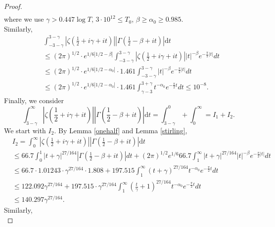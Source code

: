 \documentclass[reqno]{amsart}
\numberwithin{equation}{section}
\theoremstyle{remark}
\begin{document}
\begin{proof}
\begin{equation}
\begin{aligned}
    \end{aligned}
\end{equation}
where we use $\gamma>0.447\log T$, $3\cdot 10^{12}\le T_0$, $\beta\ge \alpha_0\ge 0.985$.\\Similarly,
\begin{equation}\label{secondint}
    \begin{aligned}
     &\int_{-3-\gamma}^{3-\gamma} \left|\zeta\left(\frac{1}{2}+i\gamma+it\right)\right|\left| \Gamma\left(\frac{1}{2}-\beta+it\right)\right|\text{d} t\\&\le (2\pi)^{1/2}\cdot e^{1/6|1/2-\beta|} \int_{-3-\gamma}^{3-\gamma}\left|\zeta\left(\frac{1}{2}+i\gamma+it\right)\right||t|^{-\beta}e^{-\frac{\pi}{2}|t|}dt \\&\le (2\pi)^{1/2}\cdot e^{1/6|1/2-\alpha_0|}\cdot1.461\int_{-3-\gamma}^{3-\gamma}|t|^{-\beta}e^{-\frac{\pi}{2}|t|}dt\\&\le (2\pi)^{1/2}\cdot e^{1/6|1/2-\alpha_0|}\cdot1.461\int_{\gamma-3}^{3+\gamma}t^{-\alpha_0}e^{-\frac{\pi}{2}t}dt\le 10^{-8}.
    \end{aligned}
\end{equation}
Finally, we consider
\[
\int_{3 - \gamma}^{\infty} \left|\zeta\left(\frac{1}{2}+i\gamma+it\right)\right|\left| \Gamma\left(\frac{1}{2}-\beta+it\right)\right|\text{d} t = \int_{3 - \gamma}^0 + \int_0^\infty = I_1 + I_2.
\]
We start with $I_2$. By Lemma \ref{onehalf} and Lemma \ref{stirling}, 
\begin{equation}\label{inti2}
    \begin{aligned}
        &I_2=\int_{0}^{\infty} \left|\zeta\left(\frac{1}{2}+i\gamma+it\right)\right|\left| \Gamma\left(\frac{1}{2}-\beta+it\right)\right|\text{d} t\\&\le 66.7\int_{0}^{1}|t+\gamma|^{ 27/164}\left| \Gamma\left(\frac{1}{2}-\beta+it\right)\right|dt+(2\pi)^{1/2} e^{1/6} 66.7 \int_{1}^{\infty}|t+\gamma|^{ 27/164}|t|^{-\beta}e^{-\frac{\pi}{2}|t|}dt\\&\le 66.7\cdot 1.01243\cdot \gamma^{27/164}\cdot 1.808+ 197.515 \int_{1}^{\infty}(t+\gamma)^{ 27/164}t^{-\alpha_0}e^{-\frac{\pi}{2}t}dt\\&\le 122.092\gamma^{27/164}+197.515 \cdot \gamma^{27/164}\int_{1}^{\infty}\left(\frac{t}{\gamma}+1\right)^{ 27/164}t^{-\alpha_0}e^{-\frac{\pi}{2}t}dt\\&\le 140.297\gamma^{27/164}.
    \end{aligned}
\end{equation}
Similarly,
\begin{equation}\label{inti1}

\end{equation}
\end{proof}
\end{document}
